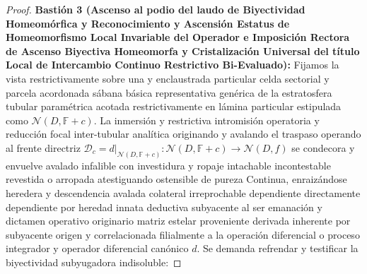 \documentclass[11pt,a4paper]{article}
\theoremstyle{definition}
\theoremstyle{remark}
\numberwithin{equation}{section}
\begin{document}
\begin{proof}
\textbf{Bastión 3 (Ascenso al podio del laudo de Biyectividad Homeomórfica y Reconocimiento y Ascensión Estatus de Homeomorfismo Local Invariable del Operador e Imposición Rectora de Ascenso Biyectiva Homeomorfa y Cristalización Universal del título Local de Intercambio Continuo Restrictivo Bi-Evaluado):} 
Fijamos la vista restrictivamente sobre una y enclaustrada particular celda sectorial y parcela acordonada sábana básica representativa genérica de la estratosfera tubular paramétrica acotada restrictivamente en lámina particular estipulada como $\mathcal{N}(D, \mathbb{F} + c)$. La inmersión y restrictiva intromisión operatoria y reducción focal inter-tubular analítica originando y avalando el traspaso operando al frente directriz $\mathcal{D}_c = d|_{\mathcal{N}(D, \mathbb{F} + c)} : \mathcal{N}(D, \mathbb{F} + c) \to \mathcal{N}(D, f)$ se condecora y envuelve avalado infalible con investidura y ropaje intachable incontestable revestida o arropada atestiguando ostensible de pureza Continua, enraizándose heredera y descendencia avalada colateral irreprochable dependiente directamente dependiente por heredad innata deductiva subyacente al ser emanación y dictamen operativo originario matriz estelar proveniente derivada inherente por subyacente origen y correlacionada filialmente a la operación diferencial o proceso integrador y operador diferencial canónico $d$. Se demanda refrendar y testificar la biyectividad subyugadora indisoluble: 

\end{proof}
\end{document}
